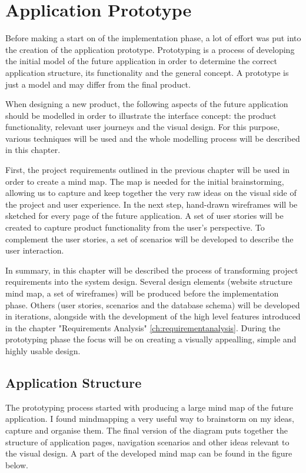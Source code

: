 \chapter{Application Prototype}
\label{ch:Prototype}
Before making a start on of the implementation phase, a lot of effort was put into the creation of the application prototype. Prototyping is a process of developing the initial model of the future application in order to determine the correct application structure, its functionality and the general concept. A prototype is just a model and may differ from the final product.

When designing a new product, the following aspects of the future application should be modelled in order to illustrate the interface concept: the product functionality, relevant user journeys and the visual design. For this purpose, various techniques will be used and the whole modelling process will be described in this chapter. 

First, the project requirements outlined in the previous chapter will be used in order to create a mind map. The map is needed for the initial brainstorming, allowing us to capture and keep together the very raw ideas on the visual side of the project and user experience. In the next step, hand-drawn wireframes will be sketched for every page of the future application. A set of user stories will be created to capture product functionality from the user's perspective. To complement the user stories, a set of scenarios will be developed to describe the user interaction. 

In summary, in this chapter will be described the process of transforming project requirements into the system design. Several design elements (website structure mind map, a set of wireframes) will be produced before the implementation phase. Others (user stories, scenarios and the database schema) will be developed in iterations, alongside with the development of the high level features introduced in the chapter "Requirements Analysis" \ref{ch:requirementanalysis}. During the prototyping phase the focus will be on creating a visually appealling, simple and highly usable design. 

\section{Application Structure}
\label{sec:applicationstructure_prototype}
The prototyping process started with producing a large mind map of the future application. I found mindmapping a very useful way to brainstorm on my ideas, capture and organise them. The final version of the diagram puts together the structure of application pages, navigation scenarios and other ideas relevant to the visual design. A part of the developed mind map can be found in the figure below.

